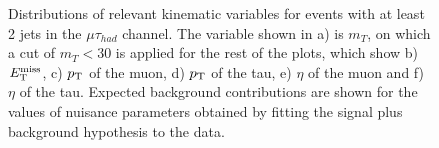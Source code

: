 \begin{figure}
\begin{center}
\end{center}
\caption{
  Distributions of relevant kinematic variables for events with at least 2 jets
  in the $\mu\tau_{had}$ channel. The variable shown in a) is $m_{T}$, on which
  a cut of $m_{T} < 30$ is applied for the rest of the plots, which
  show b) $E_{\mathrm{T}}^{\text{miss}}$, c) $p_{\mathrm{T}}$ of the muon, d) $p_{\mathrm{T}}$ of the tau, e) $\eta$ of the
  muon and f) $\eta$ of the tau. 
  Expected background contributions are shown for the values of nuisance parameters
  obtained by fitting the signal plus background hypothesis to the data.
}
\label{fig:resultsControlPlotsTauPairMuTau}
\end{figure} 

